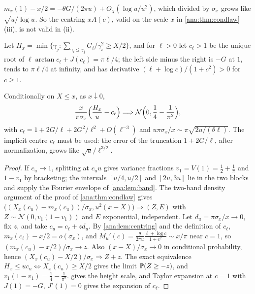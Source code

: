 \begin{remark}\label{ana:rem:centring}
$m_x(1)-x/2=-\theta G/(2\pi u)+O_\chi(\log u/u^2)$, which divided by $\sigma_x$ grows like
$\sqrt{u/\log u}$. So the centring $xA(c)$, valid on the scale $x$ in \cref{ana:thm:condlaw}(iii), is
not valid in (ii).
\end{remark}

Let $H_x=\min\{\gamma_j:\sum_{\gamma_i\le\gamma_j}G_i/\gamma_i^2\ge X/2\}$, and for $\ell>0$ let $c_\ell>1$
be the unique root of $\ell\arctan c_\ell+J(c_\ell)=\pi\ell/4$; the left side minus the right is $-G$ at
$1$, tends to $\pi\ell/4$ at infinity, and has derivative $(\ell+\log c)/(1+c^2)>0$ for $c\ge1$.

\begin{theorem}\label{ana:thm:medianheight}
Conditionally on $X\le x$, as $x\downarrow0$,
\[
 \frac x{\pi\sigma_x}\Bigl(\frac{H_x}u-c_\ell\Bigr)\Longrightarrow\mathcal N\Bigl(0,\frac14-\frac1{\pi^2}\Bigr),
\]
with $c_\ell=1+2G/\ell+2G^2/\ell^2+O(\ell^{-3})$ and $u\pi\sigma_x/x\sim\pi\sqrt{2u/(\theta\ell)}$. The
implicit centre $c_\ell$ must be used: the error of the truncation $1+2G/\ell$, after normalization,
grows like $\sqrt u/\ell^{3/2}$.
\end{theorem}

\begin{proof}
If $c_u\to1$, splitting at $c_uu$ gives variance fractions $v_1=V(1)=\frac12+\frac1\pi$ and $1-v_1$ by
bracketing; the intervals $[u/4,u/2]$ and $[2u,3u]$ lie in the two blocks and supply the Fourier
envelope of \cref{ana:lem:band}. The two-band density argument of the proof of \cref{ana:thm:condlaw}
gives $\bigl((X_x(c_u)-m_x(c_u))/\sigma_x,u^2(x-X)\bigr)\Rightarrow(Z,E)$ with
$Z\sim\mathcal N(0,v_1(1-v_1))$ and $E$ exponential, independent. Let $d_u=\pi\sigma_x/x\to0$, fix $z$, and
take $c_u=c_\ell+zd_u$. By \cref{ana:lem:centring} and the definition of $c_\ell$,
$m_x(c_\ell)-x/2=o(\sigma_x)$, and $M_u'(c)=\frac\theta{2\pi u}\frac{\ell+\log c}{1+c^2}\sim x/\pi$ near
$c=1$, so $(m_x(c_u)-x/2)/\sigma_x\to z$. Also $(x-X)/\sigma_x\to0$ in conditional probability, hence
$(X_x(c_u)-X/2)/\sigma_x\Rightarrow Z+z$. The exact equivalence $H_x\le uc_u\iff X_x(c_u)\ge X/2$ gives the
limit $\mathbb{P}(Z\ge-z)$, and $v_1(1-v_1)=\frac14-\frac1{\pi^2}$.  gives the height
scale, and Taylor expansion at $c=1$ with $J(1)=-G$, $J'(1)=0$ gives the expansion of $c_\ell$.
\end{proof}


